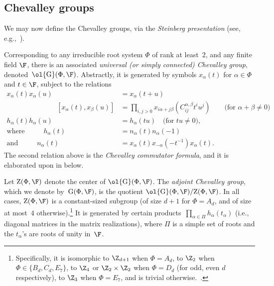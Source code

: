 \documentclass[11pt]{article}
\newcommand{\Esc}[2]{\ol{\mathrm{G}}(#1,#2)}
\newcommand{\Gu}[2]{\ol{\mathrm{G}}(#1,#2)}
\newcommand{\G}[2]{\mathrm{G}(#1,#2)}
\newcommand{\Center}[2]{\mathrm{Z}(#1,#2)}
\begin{document}
\subsection{Chevalley groups}
We may now define the Chevalley groups, via the \emph{Steinberg presentation} (see, e.g.,~\cite[Thm.~12.1.1]{Car89}).
\begin{definition}  \label{def:chevgroup}
    Corresponding to any irreducible root system $\Phi$ of rank at least~$2$, and any finite field $\F$, there is an associated \emph{universal (or simply connected) Chevalley group}, denoted~$\Esc{\Phi}{\F}$. Abstractly, it is generated by symbols $x_\alpha(t)$ for $\alpha \in \Phi$ and $t \in \F$, subject to the relations
    \begin{align*}
    x_\alpha(t)x_\alpha(u) &= x_\alpha(t+u)\\
    \phantom{\qquad \text{if } \alpha+\beta \neq 0 } %
    [x_\alpha(t),x_\beta(u)] &= \prod_{i,j>0} x_{i\alpha+j\beta}(C_{ij}^{\alpha,\beta}t^iu^j) \qquad \text{(for $\alpha+\beta \neq 0$)}\\
    h_\alpha(t)h_\alpha(u) &= h_\alpha(tu) \quad \text{(for $tu \neq 0$)},\\
    \text{where }\hspace{1cm} h_\alpha(t) &= n_\alpha(t)n_\alpha(-1)\\
    \text{and }\hspace{1cm} n_\alpha(t) &= x_\alpha(t)x_{-\alpha}(-t^{-1})x_\alpha(t).
    \end{align*}
    The second relation above is the \emph{Chevalley commutator formula}, and it is elaborated upon in  below.
\end{definition}
\begin{definition}  \label{def:adj}
    Let $\Center{\Phi}{\F}$ denote the center of $\Gu{\Phi}{\F}$.
    The \emph{adjoint Chevalley group}, which we denote by~$\G{\Phi}{\F}$, is the quotient $\Esc{\Phi}{\F}/\Center{\Phi}{\F}$.
    In all cases, $\Center{\Phi}{\F}$ is a constant-sized subgroup (of size $d+1$ for $\Phi = A_d$, and of size at most~$4$ otherwise).\footnote{Specifically, it is isomorphic to $\Z_{d+1}$ when $\Phi = A_d$, to $\Z_2$ when $\Phi \in \{B_d, C_d, E_7\}$, to $\Z_4$ or $\Z_2 \times \Z_2$ when $\Phi = D_d$ (for odd, even $d$ respectively), to $\Z_3$ when $\Phi = E_7$, and is trivial otherwise.~\cite[Sec.~3.3]{Ste16}.}
    It is generated by certain products~$\prod_{\alpha \in \Pi} h_{\alpha}(t_\alpha)$ (i.e., diagonal matrices in the matrix realizations), where $\Pi$ is a simple set of roots and the $t_\alpha$'s are roots of unity in~$\F$.
\end{definition}
\end{document}
